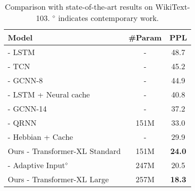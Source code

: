 \documentclass[11pt,a4paper]{article}
\begin{document}
\bgroup
\setlength{\tabcolsep}{3pt}
\begin{table}[t]
	\small
	\centering
	
	\begin{adjustwidth}{-4pt}{}
	\begin{tabular}{l|cc}
		\toprule
		\bf Model & \bf \#Param &  \bf PPL \\
		\midrule
		\citet{grave2016improving} - LSTM & - & 48.7 \\
		\citet{bai2018empirical} - TCN & - & 45.2 \\
		\citet{dauphin2016language} - GCNN-8 & - & 44.9 \\
		\citet{grave2016improving} - LSTM + Neural cache & - & 40.8 \\
		\citet{dauphin2016language} - GCNN-14 & - & 37.2 \\
		\citet{merity2018analysis} - QRNN & 151M & 33.0 \\
		\citet{rae2018fast} - Hebbian + Cache & - & 29.9 \\
		Ours - Transformer-XL Standard & 151M & \textbf{24.0} \\
		\midrule
		\citet{baevski2018adaptive} - Adaptive Input$^\diamond$ & 247M & 20.5 \\
		Ours - Transformer-XL Large & 257M & \textbf{18.3} \\
		\bottomrule
	\end{tabular}
	\caption{\small
		Comparison with state-of-the-art results on WikiText-103. $^\diamond$ indicates contemporary work.
	}
	\label{table:103}
	\end{adjustwidth}
\end{table}
\egroup
\end{document}
